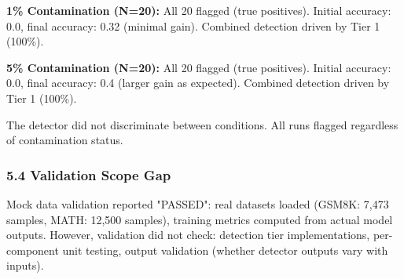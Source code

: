 \textbf{1\% Contamination (N=20):} All 20 flagged (true positives). Initial accuracy: 0.0, final accuracy: 0.32 (minimal gain). Combined detection driven by Tier 1 (100\%).

\textbf{5\% Contamination (N=20):} All 20 flagged (true positives). Initial accuracy: 0.0, final accuracy: 0.4 (larger gain as expected). Combined detection driven by Tier 1 (100\%).

The detector did not discriminate between conditions. All runs flagged regardless of contamination status.

\subsubsection{5.4 Validation Scope Gap}

Mock data validation reported "PASSED": real datasets loaded (GSM8K: 7,473 samples, MATH: 12,500 samples), training metrics computed from actual model outputs. However, validation did not check: detection tier implementations, per-component unit testing, output validation (whether detector outputs vary with inputs).
